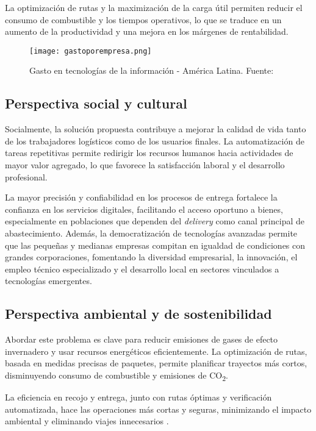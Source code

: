 La optimización de rutas y la maximización de la carga útil permiten reducir el consumo de combustible y los tiempos operativos, lo que se traduce en un aumento de la productividad y una mejora en los márgenes de rentabilidad.

\begin{figure}[H]
    \centering
    \texttt{[image: gastoporempresa.png]}
    \caption{Gasto en tecnologías de la información - América Latina. Fuente: \cite{ArticleRef255141}}
    \label{fig:gastos_tecnologia}
\end{figure}

\subsection{Perspectiva social y cultural}

Socialmente, la solución propuesta contribuye a mejorar la calidad de vida tanto de los trabajadores logísticos como de los usuarios finales. La automatización de tareas repetitivas permite redirigir los recursos humanos hacia actividades de mayor valor agregado, lo que favorece la satisfacción laboral y el desarrollo profesional.

La mayor precisión y confiabilidad en los procesos de entrega fortalece la confianza en los servicios digitales, facilitando el acceso oportuno a bienes, especialmente en poblaciones que dependen del \textit{delivery} como canal principal de abastecimiento. Además, la democratización de tecnologías avanzadas permite que las pequeñas y medianas empresas compitan en igualdad de condiciones con grandes corporaciones, fomentando la diversidad empresarial, la innovación, el empleo técnico especializado y el desarrollo local en sectores vinculados a tecnologías emergentes.

\subsection{Perspectiva ambiental y de sostenibilidad}
Abordar este problema es clave para reducir emisiones de gases de efecto invernadero y usar recursos energéticos eficientemente. La optimización de rutas, basada en medidas precisas de paquetes, permite planificar trayectos más cortos, disminuyendo consumo de combustible y emisiones de CO\textsubscript{2}.

La eficiencia en recojo y entrega, junto con rutas óptimas y verificación automatizada, hace las operaciones más cortas y seguras, minimizando el impacto ambiental y eliminando viajes innecesarios \cite{WebRef132362}.

